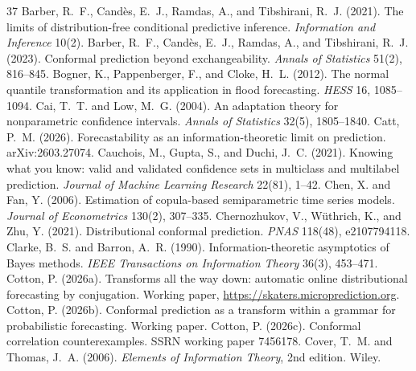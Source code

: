 \documentclass[11pt]{article}
\theoremstyle{remark}
\begin{document}

\begin{thebibliography}{37}
 Barber, R.~F., Cand\`es, E.~J.,
  Ramdas, A., and Tibshirani, R.~J. (2021). The limits of distribution-free
  conditional predictive inference. \emph{Information and Inference} 10(2).
 Barber, R.~F., Cand\`es, E.~J.,
  Ramdas, A., and Tibshirani, R.~J. (2023). Conformal prediction beyond
  exchangeability. \emph{Annals of Statistics} 51(2), 816--845.
 Bogner, K., Pappenberger, F., and
  Cloke, H.~L. (2012). The normal quantile transformation and its application
  in flood forecasting. \emph{HESS} 16, 1085--1094.
 Cai, T.~T. and Low, M.~G.
  (2004). An adaptation theory for nonparametric confidence intervals.
  \emph{Annals of Statistics} 32(5), 1805--1840.
 Catt, P.~M. (2026). Forecastability as an
  information-theoretic limit on prediction. arXiv:2603.27074.
 Cauchois, M., Gupta, S., and Duchi,
  J.~C. (2021). Knowing what you know: valid and validated confidence sets in
  multiclass and multilabel prediction. \emph{Journal of Machine Learning Research}
  22(81), 1--42.
 Chen, X. and Fan, Y. (2006).
  Estimation of copula-based semiparametric time series models. \emph{Journal
  of Econometrics} 130(2), 307--335.
  Chernozhukov, V., W\"uthrich, K., and Zhu, Y. (2021). Distributional
  conformal prediction. \emph{PNAS} 118(48), e2107794118.
 Clarke, B.~S. and Barron, A.~R.
  (1990). Information-theoretic asymptotics of Bayes methods. \emph{IEEE
  Transactions on Information Theory} 36(3), 453--471.
 Cotton, P. (2026a). Transforms all
  the way down: automatic online distributional forecasting by conjugation.
  Working paper, \url{https://skaters.microprediction.org}.
 Cotton, P. (2026b). Conformal
  prediction as a transform within a grammar for probabilistic forecasting.
  Working paper.
 Cotton, P. (2026c). Conformal
  correlation counterexamples. SSRN working paper 7456178.
 Cover, T.~M. and Thomas,
  J.~A. (2006). \emph{Elements of Information Theory}, 2nd edition. Wiley.

\end{thebibliography}
\end{document}

